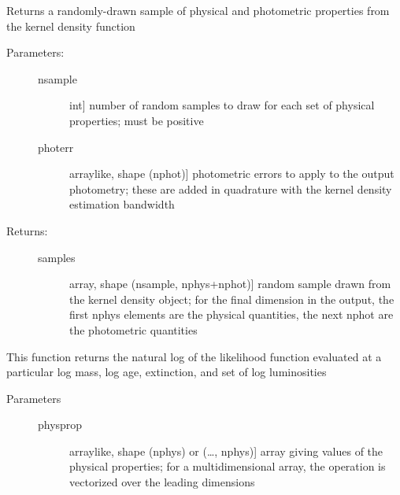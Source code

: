 \documentclass[letterpaper,10pt,english]{sphinxmanual}
\begin{document}
\begin{fulllineitems}
\begin{fulllineitems}
\begin{description}
\begin{description}
\end{description}

\end{description}

\end{fulllineitems}


\begin{fulllineitems}
\label{\detokenize{bayesphot:slugpy.bayesphot.bp.bp.draw_sample}}
Returns a randomly-drawn sample of physical and photometric
properties from the kernel density function
\begin{description}
\item[{Parameters:}] \leavevmode\begin{description}
\item[{nsample}] \leavevmode{[}int{]}
number of random samples to draw for each set of
physical properties; must be positive

\item[{photerr}] \leavevmode{[}arraylike, shape (nphot){]}
photometric errors to apply to the output photometry;
these are added in quadrature with the kernel density
estimation bandwidth

\end{description}

\item[{Returns:}] \leavevmode\begin{description}
\item[{samples}] \leavevmode{[}array, shape (nsample, nphys+nphot){]}
random sample drawn from the kernel density object; for
the final dimension in the output, the first nphys
elements are the physical quantities, the next nphot are
the photometric quantities

\end{description}

\end{description}

\end{fulllineitems}


\begin{fulllineitems}
\label{\detokenize{bayesphot:slugpy.bayesphot.bp.bp.logL}}
This function returns the natural log of the likelihood
function evaluated at a particular log mass, log age,
extinction, and set of log luminosities
\begin{description}
\item[{Parameters}] \leavevmode\begin{description}
\item[{physprop}] \leavevmode{[}arraylike, shape (nphys) or (…, nphys){]}
array giving values of the physical properties; for a
multidimensional array, the operation is vectorized over
the leading dimensions


\end{description}
\end{description}
\end{fulllineitems}
\end{fulllineitems}
\end{document}
